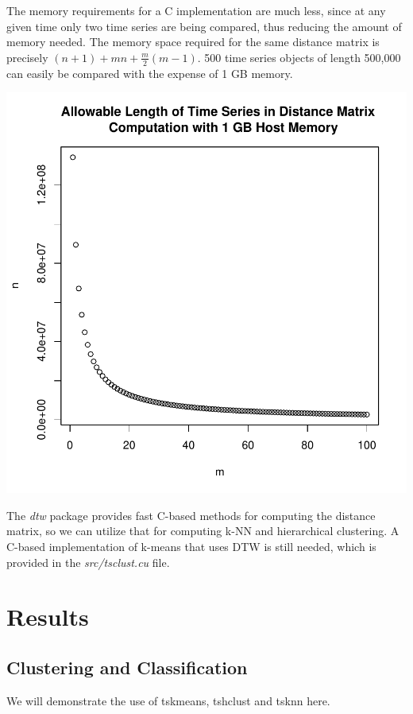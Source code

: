 \documentclass{article}
\begin{document}
The memory requirements for a C implementation are much less, since at any given
time only two time series are being compared, thus reducing the amount of memory
needed.  The memory space required for the same distance matrix is precisely
$(n+1) + mn + \frac{m}{2}(m-1)$.  500 time series objects of length 500,000 
can easily be compared with the expense of 1 GB memory.  

\includegraphics{tsclust-007}

The \textit{dtw} package provides fast C-based methods for computing the
distance matrix, so we can utilize that for computing k-NN and hierarchical
clustering.  A C-based implementation of k-means that uses DTW is still needed,
which is provided in the \textit{src/tsclust.cu} file.

\section{Results}

\subsection{Clustering and Classification}

We will demonstrate the use of tskmeans, tshclust and tsknn here.
\end{document}
